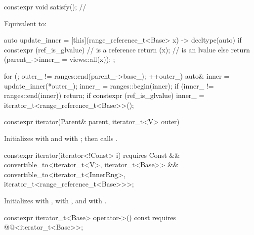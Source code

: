 \begin{itemdecl}
constexpr void satisfy();       // \expos
\end{itemdecl}

\begin{itemdescr}
\pnum
\effects
Equivalent to:
\begin{codeblock}
auto update_inner = [this](range_reference_t<Base> x) -> decltype(auto) {
  if constexpr (ref_is_glvalue) //  is a reference
    return (x);                 //  is an lvalue
  else
    return (parent_->inner_ = views::all(x));
};

for (; outer_ != ranges::end(parent_->base_); ++outer_) {
  auto& inner = update_inner(*outer_);
  inner_ = ranges::begin(inner);
  if (inner_ != ranges::end(inner))
    return;
}
if constexpr (ref_is_glvalue)
  inner_ = iterator_t<range_reference_t<Base>>();
\end{codeblock}
\end{itemdescr}

%
\begin{itemdecl}
constexpr iterator(Parent& parent, iterator_t<V> outer)
\end{itemdecl}

\begin{itemdescr}
\pnum
\effects
Initializes  with  and
 with ; then calls .
\end{itemdescr}

%
\begin{itemdecl}
constexpr iterator(iterator<!Const> i)
  requires Const &&
           convertible_to<iterator_t<V>, iterator_t<Base>> &&
           convertible_to<iterator_t<InnerRng>,
                          iterator_t<range_reference_t<Base>>>;
\end{itemdecl}

\begin{itemdescr}
\pnum
\effects
Initializes  with ,
 with , and
 with .
\end{itemdescr}

%
\begin{itemdecl}
constexpr iterator_t<Base> operator->() const
  requires @@<iterator_t<Base>>;
\end{itemdecl}

